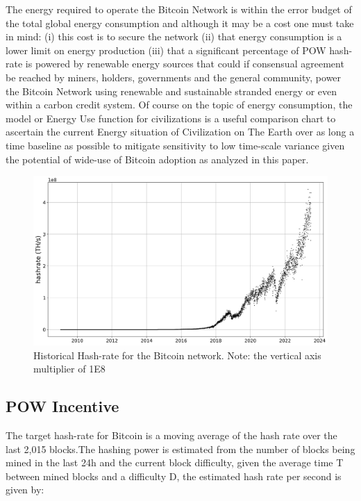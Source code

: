 \documentclass[final,5p,times,twocolumn,authoryear]{elsarticle}
\begin{document}
The energy required to operate the Bitcoin Network is within the error budget of the total global energy consumption and although it may be a  cost one must take in mind: (i) this cost is to secure the network (ii) that energy consumption is a lower limit on energy production (iii) that a significant percentage of POW hash-rate is powered by renewable energy sources that could if consensual agreement be reached by miners,  holders, governments and the general community, power the Bitcoin Network using renewable and sustainable stranded energy or even within a carbon credit system. Of course on the topic of energy consumption, the \cite{kar64} model or Energy Use function for civilizations is a useful comparison chart to ascertain the current Energy situation of Civilization on The Earth over as long a time baseline as possible to mitigate sensitivity to low time-scale variance given the potential of wide-use of Bitcoin adoption as analyzed in this paper.

\begin{figure}
    \centering
    \includegraphics[width=1\linewidth]{figs/hash_btc.png}
    \caption{Historical Hash-rate for the Bitcoin network. Note: the vertical axis multiplier of 1E8}
    \label{fig:btchash}
\end{figure}

 \subsection{POW Incentive}

The target hash-rate for Bitcoin is a moving average of the hash rate over the last 2,015 blocks.The hashing power is estimated from the number of blocks being mined in the last 24h and the current block difficulty, given the average time T between mined blocks and a difficulty D, the estimated hash rate per second is given by:\\
\end{document}
